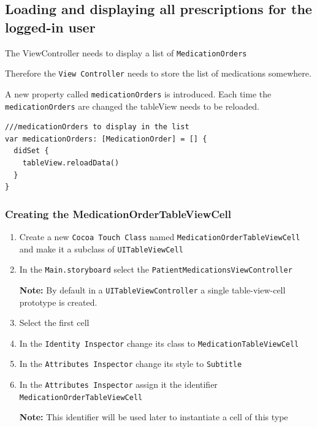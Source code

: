 \documentclass{article}
\begin{document}
\subsection{Loading and displaying all prescriptions for the logged-in user}\label{step-6.4---implementing-patientmedicationsviewcontroller---loading-and-displaying-all-prescriptions-for-the-logged-in-user}

The ViewController needs to display a list of \texttt{MedicationOrders}

Therefore the \texttt{View\ Controller} needs to store the list of
medications somewhere.

A new property called \texttt{medicationOrders} is introduced. Each time
the \texttt{medicationOrders} are changed the tableView needs to be
reloaded.

\begin{verbatim}
///medicationOrders to display in the list
var medicationOrders: [MedicationOrder] = [] {
  didSet {
    tableView.reloadData()
  }
}
\end{verbatim}

\subsubsection{Creating the MedicationOrderTableViewCell}\label{creating-the-medicationordertableviewcell}

\begin{enumerate}

\item
  Create a new \texttt{Cocoa\ Touch\ Class} named
  \texttt{MedicationOrderTableViewCell} and make it a subclass of
  \texttt{UITableViewCell}
\item
  In the \texttt{Main.storyboard} select the
  \texttt{PatientMedicationsViewController}

  \textbf{Note:}
  By default in a \texttt{UITableViewController} a single
  table-view-cell prototype is created.
\item
  Select the first cell
\item
  In the \texttt{Identity\ Inspector} change its class to
  \texttt{MedicationTableViewCell}
\item
  In the \texttt{Attributes\ Inspector} change its style to
  \texttt{Subtitle}
\item
  In the \texttt{Attributes\ Inspector} assign it the identifier
  \texttt{MedicationOrderTableViewCell}

  \textbf{Note:}
  This identifier will be used later to instantiate a cell of this type
\end{enumerate}
\end{document}
